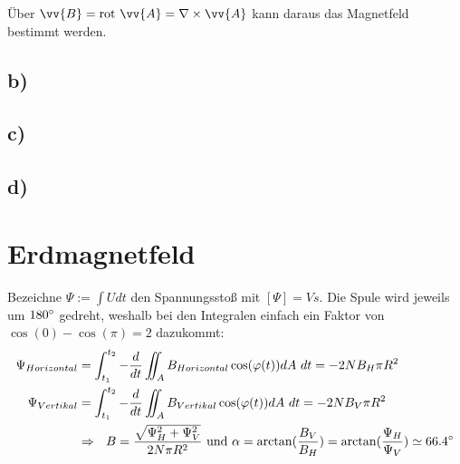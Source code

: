 \documentclass[a4paper,12pt]{article}
\begin{document}
Über $\vv{B}=\textrm{rot}\ \vv{A}=\nabla\times\vv{A}$ kann daraus das Magnetfeld bestimmt werden.

\subsection*{b)}
\subsection*{c)}
\subsection*{d)}

\section{Erdmagnetfeld}
Bezeichne $\Psi := \int U dt$ den Spannungsstoß mit $[\Psi]=Vs$. Die Spule wird jeweils um $180\degree$ gedreht, weshalb bei den Integralen einfach ein Faktor von $\cos(0)-\cos(\pi)=2$ dazukommt:
\begin{align*}
\Psi_{Horizontal} &= \int_{t_1}^{t_2} -\frac{d}{dt}\iint_A B_{Horizontal}\cos(\varphi(t))dA\ dt = -2NB_H\pi R^2\\
\Psi_{Vertikal} &= \int_{t_1}^{t_2}-\frac{d}{dt}\iint_A B_{Vertikal}\cos(\varphi(t))dA\ dt = -2NB_V\pi R^2\\
&\Rightarrow\ \ B=\frac{\sqrt{\Psi_H^2+\Psi_V^2}}{2N\pi R^2}\textrm{    und   }\alpha = \arctan(\frac{B_V}{B_H})=\arctan(\frac{\Psi_H}{\Psi_V})\simeq 66.4\degree
\end{align*}
\end{document}
